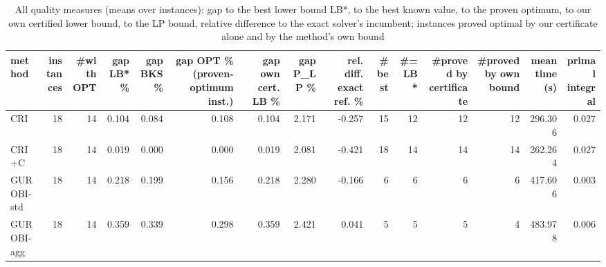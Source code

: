 \begin{table}[htbp]
\centering
\small
\caption{All quality measures (means over instances): gap to the best lower bound LB*, to the best known value, to the proven optimum, to our own certified lower bound, to the LP bound, relative difference to the exact solver's incumbent; instances proved optimal by our certificate alone and by the method's own bound}
\label{tab:E3_long_runs_b600_all_metrics}
\begin{tabular}{lrrrrrrrrrrrrrr}
\toprule
method & instances & \#with OPT & gap LB* \% & gap BKS \% & gap OPT \% (proven-optimum inst.) & gap own cert. LB \% & gap P\_LP \% & rel. diff. exact ref. \% & \#best & \#= LB* & \#proved by certificate & \#proved by own bound & mean time (s) & primal integral \\
\midrule
CRI & 18 & 14 & 0.104 & 0.084 & 0.108 & 0.104 & 2.171 & -0.257 & 15 & 12 & 12 & 12 & 296.306 & 0.027 \\
CRI+C & 18 & 14 & 0.019 & 0.000 & 0.000 & 0.019 & 2.081 & -0.421 & 18 & 14 & 14 & 14 & 262.264 & 0.027 \\
GUROBI-std & 18 & 14 & 0.218 & 0.199 & 0.156 & 0.218 & 2.280 & -0.166 & 6 & 6 & 6 & 6 & 417.606 & 0.003 \\
GUROBI-agg & 18 & 14 & 0.359 & 0.339 & 0.298 & 0.359 & 2.421 & 0.041 & 5 & 5 & 5 & 4 & 483.978 & 0.006 \\
\bottomrule
\end{tabular}
\end{table}

